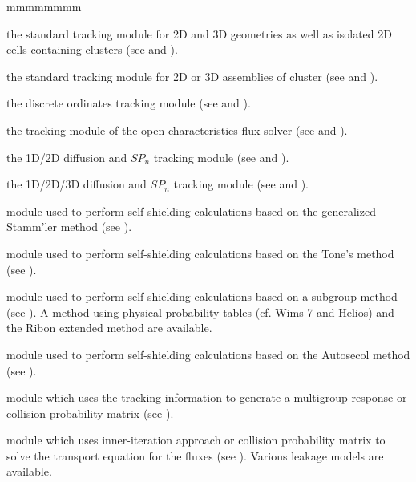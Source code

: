 \begin{ListeDeDescription}{mmmmmmmm}
\item[\moc{EXCELT:}] the standard tracking module for 2D and 3D geometries as well as isolated 2D 
cells containing clusters (see  and ).

\item[\moc{NXT:}] the standard tracking module for 2D or 3D assemblies of cluster (see
 and ).

\item[\moc{SNT:}] the discrete ordinates tracking module (see
 and ).

\item[\moc{MCCGT:}] the tracking module of the open characteristics flux
solver (see  and ).

\item[\moc{BIVACT:}] the 1D/2D diffusion and $SP_n$ tracking module (see
 and ).

\item[\moc{TRIVAT:}] the 1D/2D/3D diffusion and $SP_n$ tracking module (see
 and ).

\item[\moc{SHI:}] module used to perform self-shielding calculations
based on the generalized Stamm'ler method (see ).

\item[\moc{TONE:}] module used to perform self-shielding calculations
based on the Tone's method (see ).

\item[\moc{USS:}] module used to perform self-shielding calculations
based on a subgroup method (see ). A method using physical
probability tables (cf. Wims-7 and Helios) and the Ribon extended method
are available.

\item[\moc{AUTO:}] module used to perform self-shielding calculations
based on the Autosecol method (see ).

\item[\moc{ASM:}] module which uses the tracking information to
generate a multigroup response or collision probability matrix (see
).

\item[\moc{FLU:}] module which uses inner-iteration approach or
collision probability matrix to solve the transport equation for the fluxes
(see ). Various leakage models are available.


\end{ListeDeDescription}
